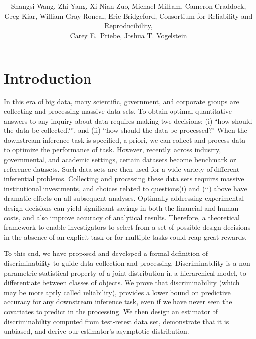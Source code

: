 \documentclass{article}
\title{\vspace{-50pt}
\db{Optimal Design for Discovery Science via Maximizing Discriminability: \\ Applications in Neuroimaging}
}
\author{Shangsi Wang, Zhi Yang, Xi-Nian Zuo, Michael Milham, Cameron Craddock,  \\ 
Greg Kiar, William Gray Roncal, Eric Bridgeford,
Consortium for Reliability and Reproducibility, \\ Carey E.~Priebe, Joshua T. Vogelstein}
\begin{document}
\maketitle
\tableofcontents
\newpage
\linenumbers

\section{Introduction}

 In this era of big data, many scientific, government, and corporate groups are collecting and processing massive data sets. To obtain optimal quantitative answers to any inquiry about data requires making two decisions: (i) “how should the data be collected?”, and (ii) “how should the data be processed?”  When the downstream inference task is specified, a priori, we can collect and process data to optimize the performance of task. However, recently, across industry, governmental, and academic settings, certain datasets become benchmark or reference datasets. Such data sets are then used for a wide variety of different inferential problems. Collecting and processing these data sets requires massive institutional investments, and choices related to questions(i) and (ii) above have dramatic effects on all subsequent analyses. Optimally addressing experimental design decisions can yield significant savings in both the financial and human costs, and also improve accuracy of analytical results. Therefore, a theoretical framework to enable investigators to select from a set of possible design decisions in the absence of an explicit task or for multiple tasks could reap great rewards.



To this end, we have proposed and developed a formal definition of discriminability to guide data collection and processing. Discriminability is a non-parametric statistical property of a joint distribution in a hierarchical model, to differentiate between classes of objects. We prove that discriminability (which may be more aptly called reliability), provides a lower bound on predictive accuracy for any downstream inference task, even if we have never seen the covariates to predict in the processing. We then design an estimator of discriminability computed from test-retest data set, demonstrate that it is unbiased, and derive our estimator’s asymptotic distribution. 
\end{document}
